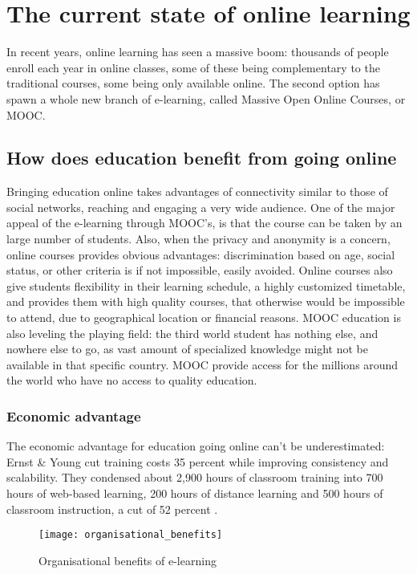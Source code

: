 \section{The current state of online learning}
In recent years, online learning has seen a massive boom: thousands of people
enroll each year in online classes, some of these being complementary to the
traditional courses, some being only available online. The second option has
spawn a whole new branch of e-learning, called Massive Open Online Courses, or
MOOC.

\subsection{How does education benefit from going online}
Bringing education online takes advantages of connectivity similar to those of
social networks, reaching and engaging a very wide audience.  One of the major
appeal of the e-learning through MOOC's, is that the course can be taken by an
large number of students. Also, when the privacy and anonymity is a concern,
online courses provides obvious advantages: discrimination based on age, social status, or other
criteria is if not impossible, easily avoided. Online courses also give
students flexibility in their learning schedule, a highly customized timetable,
and provides them with high quality courses, that otherwise would be impossible
to attend, due to geographical location or financial reasons.
MOOC education is also leveling the playing field: the third world student has
nothing else, and nowhere else to go, as vast amount of specialized knowledge
might not be available in that specific country. MOOC provide access for the
millions around the world who have no access to quality education.

\subsubsection{Economic advantage}
The economic advantage for education going
online can't be underestimated: Ernst \& Young cut training costs 35 percent
while improving consistency and scalability. They condensed about 2,900 hours of
classroom training into 700 hours of web-based learning, 200 hours of distance
learning and 500 hours of classroom instruction, a cut of 52
percent \citep{organisationalbenefits}.

\begin{figure}[!ht]
\centering
\texttt{[image: organisational\_benefits]}
\caption{Organisational benefits of e-learning}
\label{fig:Organisational_benefits}
\end{figure}

